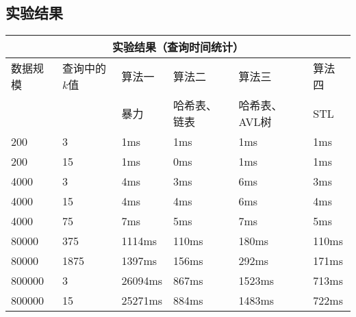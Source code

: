 \documentclass{article}
\begin{document}
\subsection{实验结果}
\begin{table}[H]
    \centering
    \begin{tabular}{|p{2.5cm}<{\centering}|p{3cm}<{\centering}|p{2.4cm}<{\centering}|p{2cm}<{\centering}|p{3.5cm}<{\centering}|p{2cm}<{\centering}|}
        \hline
        \multicolumn{6}{|c|}{实验结果（查询时间统计）}                                                                           \\
        \hline
        数据规模                      & 查询中的$k$值 & 算法一       & 算法二 \qquad \small & 算法三 \qquad            & 算法四  \\
                                      &               & \small{暴力} & \small{哈希表、链表} & \small{哈希表、AVL树}    & STL     \\
        \hline
        200                           & 3             & 1ms          & 1ms                  & 1ms                      & 1ms     \\
        \hline
        200                           & 15            & 1ms          & 0ms                  & 1ms                      & 1ms     \\
        \hline
        4000                          & 3             & 4ms          & 3ms                  & 6ms                      & 3ms     \\
        \hline
        4000                          & 15            & 4ms          & 4ms                  & 6ms                      & 4ms     \\
        \hline
        4000                          & 75            & 7ms          & 5ms                  & 7ms                      & 5ms     \\
        \hline
        80000                         & 375           & 1114ms       & 110ms                & 180ms                    & 110ms   \\
        \hline
        80000                         & 1875          & 1397ms       & 156ms                & 292ms                    & 171ms   \\
        \hline
        800000                        & 3             & 26094ms      & 867ms                & 1523ms                   & 713ms   \\
        \hline
        800000                        & 15            & 25271ms      & 884ms                & 1483ms                   & 722ms   \\

\end{tabular}
\end{table}
\end{document}
